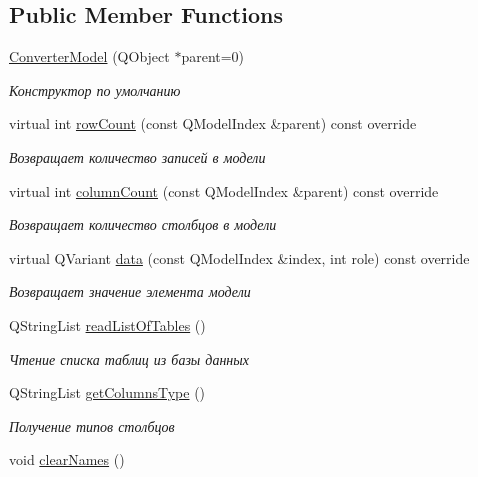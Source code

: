 \subsection*{Public Member Functions}
\begin{DoxyCompactItemize}
\item 
\hyperlink{classConverterModel_a03f3ce07fd6ab7c689ed79ff68008562}{Converter\+Model} (Q\+Object $\ast$parent=0)
\begin{DoxyCompactList}\small\item\em Конструктор по умолчанию \end{DoxyCompactList}\item 
virtual int \hyperlink{classConverterModel_a503b63db81bbc9f61fbdb4d042a9940b}{row\+Count} (const Q\+Model\+Index \&parent) const override
\begin{DoxyCompactList}\small\item\em Возвращает количество записей в модели \end{DoxyCompactList}\item 
virtual int \hyperlink{classConverterModel_ac86fe308aa90013c5b1ba3609efd2319}{column\+Count} (const Q\+Model\+Index \&parent) const override
\begin{DoxyCompactList}\small\item\em Возвращает количество столбцов в модели \end{DoxyCompactList}\item 
virtual Q\+Variant \hyperlink{classConverterModel_ac7293b25f07dc831e22fb830074b5625}{data} (const Q\+Model\+Index \&index, int role) const override
\begin{DoxyCompactList}\small\item\em Возвращает значение элемента модели \end{DoxyCompactList}\item 
Q\+String\+List \hyperlink{classConverterModel_a7eb359fd8866173131a7dc3b40ba9d8d}{read\+List\+Of\+Tables} ()
\begin{DoxyCompactList}\small\item\em Чтение списка таблиц из базы данных \end{DoxyCompactList}\item 
Q\+String\+List \hyperlink{classConverterModel_a3f16894425efdf6c2b484c6cbd199ee7}{get\+Columns\+Type} ()
\begin{DoxyCompactList}\small\item\em Получение типов столбцов \end{DoxyCompactList}\item 
void \hyperlink{classConverterModel_ae7a00de16ef1c854e89a722edeab9421}{clear\+Names} ()\hypertarget{classConverterModel_ae7a00de16ef1c854e89a722edeab9421}{}\label{classConverterModel_ae7a00de16ef1c854e89a722edeab9421}


\end{DoxyCompactItemize}
